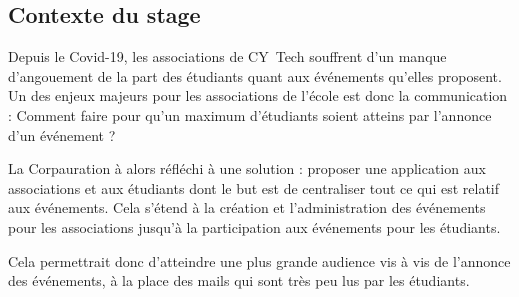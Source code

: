 \subsection{Contexte du stage}

Depuis le Covid-19, les associations de CY~Tech souffrent d'un manque d'angouement de la part des étudiants quant aux événements qu'elles proposent. Un des enjeux majeurs pour les associations de l'école est donc la communication : Comment faire pour qu'un maximum d'étudiants soient atteins par l'annonce d'un événement ?

La Corpauration à alors réfléchi à une solution : proposer une application aux associations et aux étudiants dont le but est de centraliser tout ce qui est relatif aux événements. Cela s'étend à la création et l'administration des événements pour les associations jusqu'à la participation aux événements pour les étudiants. 

Cela permettrait donc d'atteindre une plus grande audience vis à vis de l'annonce des événements, à la place des mails qui sont très peu lus par les étudiants.